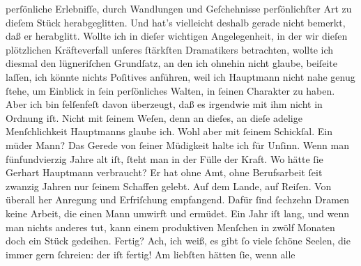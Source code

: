 \begin{ledgroupsized}[t]{13cm}
{{                  perſönliche Erlebniſſe, durch Wandlungen und Geſchehnisse perſönlichſter Art zu
                  dieſem Stück
                  herabgeglitten. Und hat’s vielleicht deshalb gerade nicht bemerkt, daß er
                  herabglitt. Wollte ich in dieſer wichtigen Angelegenheit, in der wir dieſen
                  plötzlichen Kräfteverfall unſeres ſtärkſten Dramatikers betrachten, wollte ich
                  diesmal den lügneriſchen Grundſatz, an den ich ohnehin nicht glaube, beiſeite
                  laſſen, ich könnte nichts Poſitives anführen, weil ich Hauptmann nicht nahe genug ſtehe, um Einblick in ſein
                  perſönliches Walten, in ſeinen Charakter zu haben. Aber ich bin felſenfeſt davon
                  überzeugt, daß es irgendwie mit ihm nicht in Ordnung iſt. Nicht mit ſeinem Weſen,
                  denn an dieſes, an dieſe adelige Menſchlichkeit Hauptmanns glaube ich. Wohl aber mit ſeinem Schickſal. Ein müder Mann?
                  Das Gerede von ſeiner Müdigkeit halte ich für Unſinn. Wenn man fünfundvierzig
                  Jahre alt iſt, ſteht man in der Fülle der Kraft. Wo hätte ſie Gerhart Hauptmann verbraucht? Er hat ohne Amt, ohne
                  Berufsarbeit ſeit zwanzig Jahren nur ſeinem Schaffen gelebt. Auf dem Lande, auf
                  Reiſen. Von überall her Anregung und Erfriſchung empfangend. Dafür ſind ſechzehn
                  Dramen keine Arbeit, die einen Mann umwirft und ermüdet. Ein Jahr iſt lang, und
                  wenn man nichts anderes tut, kann einem produktiven Menſchen in zwölf Monaten doch
                  ein Stück gedeihen. Fertig? Ach, ich weiß, es gibt ſo viele ſchöne Seelen, die
                  immer gern ſchreien: der iſt fertig! Am liebſten hätten ſie, wenn alle
}}
\end{ledgroupsized}
